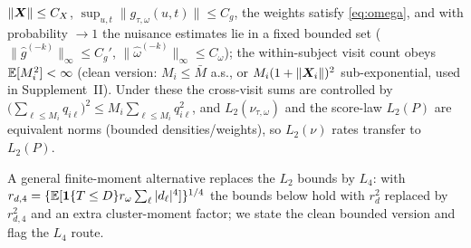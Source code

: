 \begin{assumption}\label{as:bdd}
$\|\bm{X}\|\le C_X$, $\sup_{u,t}\|g_{\tau,\omega}(u,t)\|\le C_g$, the weights satisfy
\eqref{eq:omega}, and with probability $\to1$ the nuisance estimates lie in a
fixed bounded set ($\|\widehat g^{(-k)}\|_\infty\le C_g'$,
$\|\widehat\omega^{(-k)}\|_\infty\le C_\omega$); the within-subject visit count
obeys $\mathbb{E}[M_i^{2}]<\infty$ (clean version: $M_i\le \bar M$ a.s., or
$M_i(1+\|\bm{X}_i\|)^2$ sub-exponential, used in Supplement~II). Under these the
cross-visit sums are controlled by $\big(\sum_{\ell\le M_i}q_{i\ell}\big)^2\le
M_i\sum_{\ell\le M_i}q_{i\ell}^2$, and $L_2(\nu_{\tau,\omega})$ and the score-law
$L_2(P)$ are equivalent norms (bounded densities/weights), so $L_2(\nu)$ rates
transfer to $L_2(P)$.
\end{assumption}
\noindent A general finite-moment alternative replaces the $L_2$ bounds by $L_4$:
with $r_{d,4}=\{\mathbb{E}[\mathbf{1}\{T\le D\}r_\omega\sum_\ell|d_\ell|^4]\}^{1/4}$ the bounds
below hold with $r_d^2$ replaced by $r_{d,4}^2$ and an extra cluster-moment
factor; we state the clean bounded version and flag the $L_4$ route.

